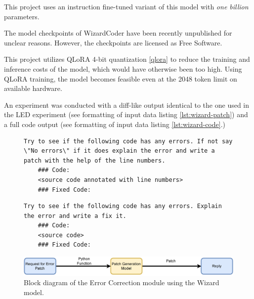     This project uses an instruction fine-tuned variant of this model with \emph{one billion} parameters.
    
    The model checkpoints of WizardCoder have been recently unpublished for unclear reasons. However, the checkpoints are licensed as Free Software.
    
    This project utilizes QLoRA 4-bit quantization \ref{qlora} to reduce the training and inference costs of the model, which would have otherwise been too high. Using QLoRA training, the model becomes feasible even at the 2048 token limit on available hardware.
    
    An experiment was conducted with a diff-like output identical to the one used in the LED experiment (see formatting of input data listing \ref{lst:wizard-patch}) and a full code output (see formatting of input data listing \ref{lst:wizard-code}.)

  \begin{figure}[H]
  \begin{lstlisting}[caption={Prompt used to adapt WizardCoder to correct errors by generating patches.}, label={lst:wizard-patch}, numbers=none]
    Try to see if the following code has any errors. If not say \"No errors\" if it does explain the error and write a patch with the help of the line numbers.
    ### Code:
    <source code annotated with line numbers>
    ### Fixed Code:
   \end{lstlisting}
   
  \begin{lstlisting}[caption={Prompt used to adapt WizardCoder to correct errors by rewriting the code without the error.}, label={lst:wizard-code}, numbers=none]
    Try to see if the following code has any errors. Explain the error and write a fix it.
    ### Code:
    <source code>
    ### Fixed Code:
   \end{lstlisting}
  \end{figure}
    \begin{figure}[H]
      \centering
      \includegraphics[width=1\textwidth]{obrazky-figures/error-correction-wizzrard.pdf}
       \caption{Block diagram of the Error Correction module using the Wizard model.}
      \label{fig:error-correction-wizzard}
    \end{figure}

